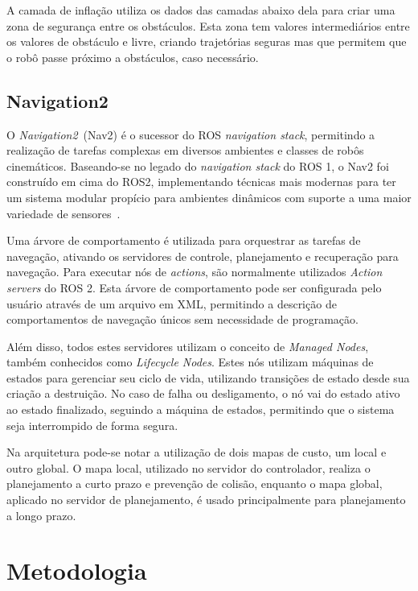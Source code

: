 \documentclass[repeatfields,xlists,xpacks,oneside,yearsonly]{ufrgscca}
\begin{document}
A camada de inflação utiliza os dados das camadas abaixo dela para
criar uma zona de segurança entre os obstáculos. Esta zona tem
valores intermediários entre os valores de obstáculo e livre, criando
trajetórias seguras mas que permitem que o robô passe próximo a
obstáculos, caso necessário.

\section{Navigation2}

O \textit{Navigation2}~(Nav2) é o sucessor do ROS \textit{navigation
    stack}, permitindo a realização de tarefas complexas em diversos
ambientes e classes de robôs cinemáticos. Baseando-se no legado do
\textit{navigation stack} do ROS 1, o Nav2 foi construído em cima do
ROS2, implementando técnicas mais modernas para ter um sistema
modular propício para ambientes dinâmicos com suporte a uma maior
variedade de sensores~\cite{Nav2}.

Uma árvore de comportamento é utilizada para orquestrar as tarefas de
navegação, ativando os servidores de controle, planejamento e
recuperação para navegação. Para executar nós de \textit{actions},
são normalmente utilizados \textit{Action servers} do ROS 2. Esta
árvore de comportamento pode ser configurada pelo usuário através de
um arquivo em XML, permitindo a descrição de comportamentos de
navegação únicos sem necessidade de programação.

Além disso, todos estes servidores utilizam o conceito de
\textit{Managed Nodes}, também conhecidos como \textit{Lifecycle
    Nodes}. Estes nós utilizam máquinas de estados para gerenciar seu
ciclo de vida, utilizando transições de estado desde sua criação a
destruição. No caso de falha ou desligamento, o nó vai do estado
ativo ao estado finalizado, seguindo a máquina de estados, permitindo
que o sistema seja interrompido de forma segura.

Na arquitetura pode-se notar a utilização de dois mapas de custo, um
local e outro global. O mapa local, utilizado no servidor do
controlador, realiza o planejamento a curto prazo e prevenção de
colisão, enquanto o mapa global, aplicado no servidor de
planejamento, é usado principalmente para planejamento a longo prazo.

\chapter{Metodologia}
\label{desenvolvimento}
\end{document}

